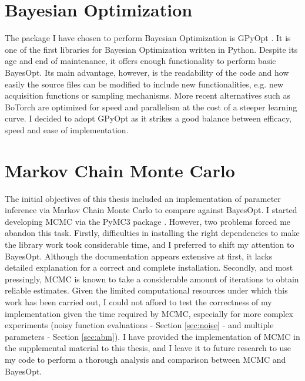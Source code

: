 \documentclass[bsc,frontabs,singlespacing,parskip,deptreport]{infthesis}
\begin{document}
\section{Bayesian Optimization}\label{sec:BO}
The package I have chosen to perform Bayesian Optimization is GPyOpt \cite{GPyOpt, GPyOpt_home}. It is one of the first libraries for Bayesian Optimization written in Python. Despite its age and end of maintenance, it offers enough functionality to perform basic BayesOpt. Its main advantage, however, is the readability of the code and how easily the source files can be modified to include new functionalities, e.g. new acquisition functions or sampling mechanisms. More recent alternatives such as BoTorch \cite{BoTorch} are optimized for speed and parallelism at the cost of a steeper learning curve. I decided to adopt GPyOpt as it strikes a good balance between efficacy, speed and ease of implementation.

\section{Markov Chain Monte Carlo}\label{sec:mcmc}
The initial objectives of this thesis included an implementation of parameter inference via Markov Chain Monte Carlo to compare against BayesOpt. I started developing MCMC via the PyMC3 package \cite{PyMC3}. However, two problems forced me abandon this task. Firstly, difficulties in installing the right dependencies to make the library work took considerable time, and I preferred to shift my attention to BayesOpt. Although the documentation appears extensive at first, it lacks detailed explanation for a correct and complete installation. Secondly, and most pressingly, MCMC is known to take a considerable amount of iterations to obtain reliable estimates. Given the limited computational resources under which this work has been carried out, I could not afford to test the correctness of my implementation given the time required by MCMC, especially for more complex experiments (noisy function evaluations - Section \ref{sec:noise} - and multiple parameters -  Section \ref{sec:abm}). I have provided the implementation of MCMC in the supplemental material to this thesis, and I leave it to future research to use my code to perform a thorough analysis and comparison between MCMC and BayesOpt.
\end{document}
